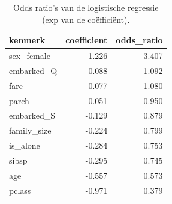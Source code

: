 \begin{table}[htbp]
\caption{Odds ratio's van de logistische regressie (exp van de coëfficiënt).}
\label{tab:oddsratios}
\begin{tabular}{lrr}
\toprule
kenmerk & coefficient & odds\_ratio \\
\midrule
sex\_female & 1.226 & 3.407 \\
embarked\_Q & 0.088 & 1.092 \\
fare & 0.077 & 1.080 \\
parch & -0.051 & 0.950 \\
embarked\_S & -0.129 & 0.879 \\
family\_size & -0.224 & 0.799 \\
is\_alone & -0.284 & 0.753 \\
sibsp & -0.295 & 0.745 \\
age & -0.557 & 0.573 \\
pclass & -0.971 & 0.379 \\
\bottomrule
\end{tabular}
\end{table}
